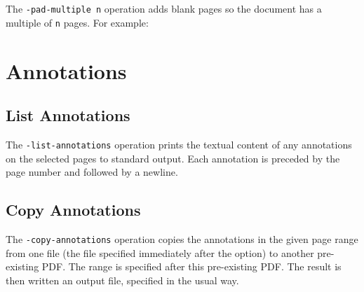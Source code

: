 \documentclass{book}
\begin{document}
  The \verb!-pad-multiple n! operation adds blank pages so the document has a multiple of \verb!n! pages. For example:

\noindent{}
 

\chapter{Annotations}
\noindent{}

  \section{List Annotations}
  The \texttt{-list-annotations} operation prints the textual content of any
annotations on the selected pages to standard output. Each annotation is preceded by the page number and followed by a newline.

\noindent{}

  \section{Copy Annotations}
  The \texttt{-copy-annotations} operation copies the annotations in the given
page range from one file (the file specified immediately after the option) to
another pre-existing PDF. The range is specified after this pre-existing PDF.
The result is then written an output file, specified in the usual way.
\noindent{}
\end{document}
